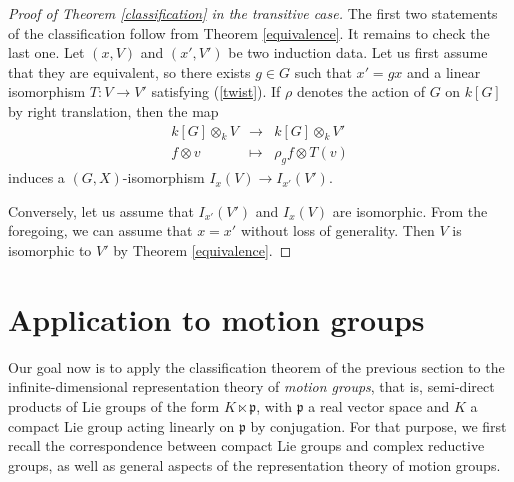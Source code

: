 \documentclass{amsart}
\theoremstyle{definition}
\begin{document}
    \begin{proof}[Proof of Theorem \ref{classification} in the transitive case]
    
    The first two statements of the classification follow from Theorem \ref{equivalence}. It remains to check the last one.
    Let $(x,V)$ and $(x',V')$ be two induction data. Let us first assume that they are equivalent, so there exists $g \in G$ such that $x' = gx$ and a linear isomorphism $T : V\to V'$ satisfying (\ref{twist}). If $\rho$ denotes the action of $G$ on $k[G]$ by right translation, then the map
    $$\begin{array}{cclll}
        k[G] \otimes_k V & \longrightarrow & k[G] \otimes_kV' \\
        f \otimes v & \longmapsto & \rho_gf \otimes T(v) 
    \end{array}$$
    induces a $(G, X)$-isomorphism $I_x(V) \to I_{x'}(V')$.
    
    Conversely, let us assume that $I_{x'}(V')$ and $I_{x}(V)$ are isomorphic. From the foregoing, we can assume that $x = x'$ without loss of generality. Then $V$ is isomorphic to $V'$ by Theorem \ref{equivalence}.
\end{proof}

\section{Application to motion groups}

Our goal now is to apply the classification theorem of the previous section to the infinite-dimensional representation theory of \textit{motion groups}, that is, semi-direct products of Lie groups of the form $K \ltimes \mathfrak{p}$, with $\mathfrak{p}$ a real vector space and $K$ a compact Lie group acting linearly on $\mathfrak{p}$ by conjugation. For that purpose, we first recall the correspondence between compact Lie groups and complex reductive groups, as well as general aspects of the representation theory of motion groups.
\end{document}
